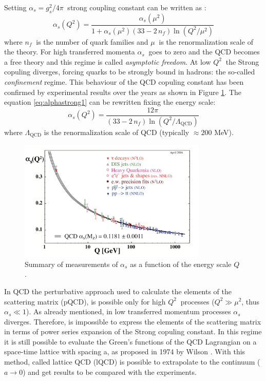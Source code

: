 Setting $\alpha_{s} = g^{2}_{s}/4\pi\ $ strong coupling constant can be written as \cite{pdg}:
\begin{equation} \label{eq:alphastrong1}
    \alpha_{s}(Q^{2}) = \frac{\alpha_{s}(\mu^{2})}{1 + \alpha_{s}(\mu^{2})(33 - 2\,n_{f})
    \ln(Q^{2}/\mu^{2})}
\end{equation}
where $n_{f}\ $ is the number of quark families and $\mu\ $ is the renormalization scale of 
the theory.
For high transferred momenta $\alpha_{s}\ $ goes to zero and the QCD becomes a free theory and 
this regime is called \textit{asymptotic freedom}. At low $Q^{2}\ $ the Strong copuling diverges,
forcing quarks to be strongly bound in hadrons: the so-called \textit{confinement} regime. 
This behaviour of the QCD copuling constant has been confirmed by experimental results over the
years as shown in Figure \ref{fig:alpharun}.
The equation \ref{eq:alphastrong1} can be rewritten fixing the energy scale:
\begin{equation} \label{eq:alphastrong2}
    \alpha_{s}(Q^{2}) = \frac{12 \pi}{(33 - 2\,n_{f})\ln(Q^{2}/\Lambda_{\mathrm{QCD}})}
\end{equation}
where $\Lambda_{\mathrm{QCD}}$ is the renormalization scale of QCD (typically $\approx 200$ MeV).

\begin{figure}
    \captionsetup{justification=centering}
    \centering
    \includegraphics[width=0.8\textwidth]{gfx/alpharun}
	\caption{Summary of measurements of $\alpha_{s}$ as a function of the energy scale $Q$ \cite{pdg}.}
	\label{fig:alpharun}
\end{figure}

In QCD the perturbative approach used to calculate the elements of the scattering matrix (pQCD), is 
possible only for high $Q^{2}\ $ processes ($Q^{2} \gg \mu^{2}$, thus $\alpha_{s} \ll 1$).
As already mentioned, in low transferred momentum processes $\alpha_{s}$ diverges. 
Therefore, is impossible to express the elements of the scattering matrix in terms of power series
expansion of the Strong copuling constant.
In this regime it is still possible to evaluate the Green’s functions of the QCD Lagrangian
on a space-time lattice with spacing a, as proposed in 1974 by Wilson \cite{lattice}.
With this method, called lattice QCD (lQCD) is possible to extrapolate to the continuum 
($a \rightarrow 0$) and get results to be compared with the experiments.

